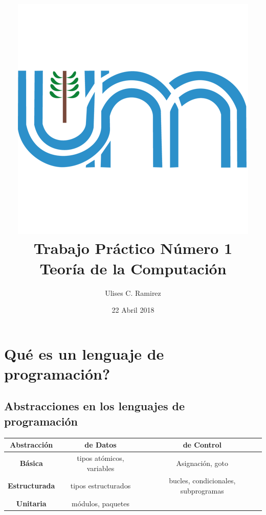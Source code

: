\documentclass{article}
\begin{document}
\title{\includegraphics{unam-logo.png}\\Trabajo Pr\'actico N\'umero 1\\Teor\'ia de la Computaci\'on}
\author{Ulises C. Ramirez}
\date{22 Abril 2018}
\maketitle
{}
\newpage

\section{{\textquestiondown}Qu\'e es un lenguaje de programaci\'on?}
\subsection{Abstracciones en los lenguajes de programaci\'on}

\begin{center}
	\begin{tabular}{|| c  c  c ||} 
		\hline
		\textbf{Abstracci\'on} & \textbf{de Datos} & \textbf{de Control} \\ [0.5ex] 
		\hline\hline
		\textbf{B\'asica} & tipos at\'omicos, variables & Asignaci\'on, goto \\ 
		\hline
		\textbf{Estructurada} & tipos estructurados & bucles, condicionales, subprogramas \\
		\hline
		\textbf{Unitaria} & m\'odulos, paquetes \\
		\hline
	\end{tabular}
\end{center}
\end{document}
